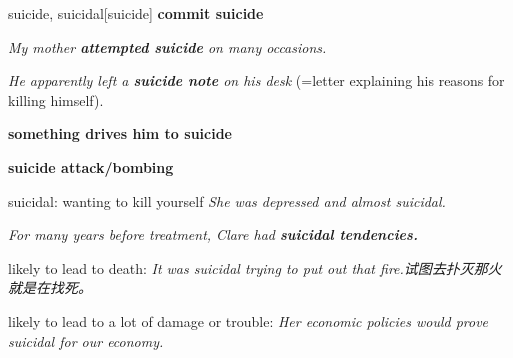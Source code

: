 \begin{word}{suicide, suicidal}[suicide]
    \textbf{commit suicide}

    \textit{My mother \textbf{attempted suicide} on many occasions.}

    \textit{He apparently left a \textbf{suicide note} on his desk} (=letter explaining his reasons for killing himself).

    \textbf{something drives him to suicide}

    \textbf{suicide attack/bombing}

    suicidal: 
    wanting to kill yourself
    \textit{She was depressed and almost suicidal.}

    \textit{For many years before treatment, Clare had \textbf{suicidal tendencies.}}

    likely to lead to death:
    \textit{It was suicidal trying to put out that fire.试图去扑灭那火就是在找死。}

    likely to lead to a lot of damage or trouble: 
    \textit{Her economic policies would prove suicidal for our economy.}
\end{word}